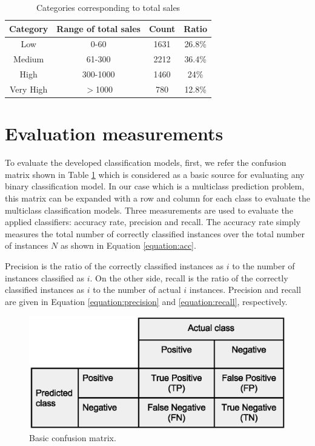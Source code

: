 \documentclass[a4paper,10pt,onecolumn,preprint,3p]{elsarticle}
\begin{document}
\begin{table}[ht]
\caption{Categories corresponding to total sales }
\centering{}%
\begin{tabular}{|c|c|c|c|}
\hline 
Category & Range of total sales & Count & Ratio\tabularnewline
\hline 
\hline 
Low & 0-60 & 1631 & 26.8\%\tabularnewline
\hline 
Medium & 61-300 & 2212 & 36.4\%\tabularnewline
\hline 
High & 300-1000 & 1460 & 24\%\tabularnewline
\hline 
Very High & $>$1000 & 780 & 12.8\%\tabularnewline
\hline 
\end{tabular}
\label{table:freq}
\end{table}


\section{Evaluation measurements}
\label{sec:eval_measures}

To evaluate the developed classification models, first, we refer the confusion matrix shown in Table \ref{fig:confusionmatrix} which is considered as a basic source for evaluating any binary classification model. In our case which is a multiclass prediction problem, this matrix can be expanded with a row and column for each class to evaluate the multiclass classification models. Three measurements are used to evaluate the applied classifiers: accuracy rate, precision and recall. The accuracy rate simply measures the total number of correctly classified instances over the total number of instances $N$ as shown in Equation \ref{equation:acc}.

Precision is the ratio of the correctly classified instances as $i$ to the number of instances classified as $i$. On the other side, recall is the ratio of the correctly classified instances as $i$ to the number of actual $i$ instances. Precision and recall are given in Equation \ref{equation:precision} and \ref{equation:recall}, respectively.


\begin{figure}[ht]
\begin{center}
\includegraphics[scale=0.50]{Confusion-matrix}
\end{center}
\caption{Basic confusion matrix.}
\label{fig:confusionmatrix}
\end{figure}
\end{document}

